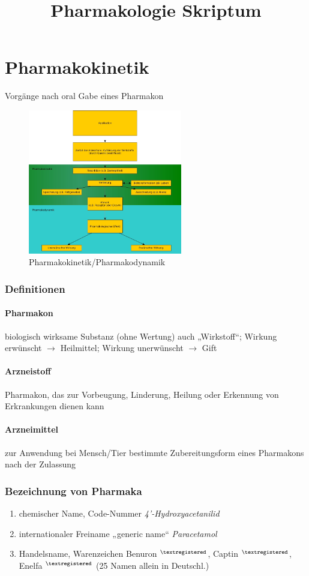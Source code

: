 \documentclass[10pt,a4paper]{report}
\title{Pharmakologie Skriptum}
\begin{document}
\maketitle

\tableofcontents
\chapter{Pharmakokinetik} Vorgänge nach oral Gabe eines Pharmakon
\begin{figure}[h]
	\centering 
	\includegraphics[width=0.6\textwidth]{Pharmakokinetik.jpg} 
	\caption{Pharmakokinetik/Pharmakodynamik} 
	\label{fig:Pharmakokinetik}
\end{figure}
\subsection{Definitionen}
\subsubsection{Pharmakon} biologisch wirksame Substanz (ohne Wertung)
		auch „Wirkstoff“; Wirkung erwünscht $\rightarrow$ Heilmittel;
					Wirkung unerwünscht  $\rightarrow$ Gift
\subsubsection{Arzneistoff} Pharmakon, das zur Vorbeugung, Linderung, Heilung oder 
Erkennung von Erkrankungen dienen kann
\subsubsection{Arzneimittel} zur Anwendung bei Mensch/Tier bestimmte Zubereitungsform eines Pharmakons nach der Zulassung
\subsection{Bezeichnung von Pharmaka}
\begin{enumerate}
	\item chemischer Name, Code-Nummer	\textit{4’-Hydroxyacetanilid}
	\item internationaler Freiname „generic name“	\textit{Paracetamol}
	\item Handelsname, Warenzeichen Benuron $^{\textregistered} $, Captin $ ^{\textregistered} $, Enelfa $^{\textregistered}$ 
	(25 Namen allein in Deutschl.)
\end{enumerate}
\end{document}
